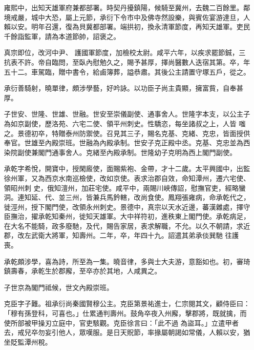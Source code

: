 \begin{pinyinscope}
 雍熙中，出知天雄軍府兼都部署。時契丹擾鎮陽，候騎至冀州，去魏二百餘里。鄰境戒嚴，城中大恐，屬上元節，承衍下令市中及佛寺然設樂，與賓佐宴游達旦，人賴以安。明年召還，復為貝冀都部署。端拱初，換永清軍節度，再知天雄軍。吏民千餘詣監軍，請為本道節帥，詔褒之。



 真宗即位，改河中尹、
 護國軍節度，加檢校太尉。咸平六年，以疾求罷節鋮，三抗表不許。帝自臨問，至臥內慰勉久之，賜予甚厚，擇尚醫數人迭宿其第。卒，年五十二。車駕臨，贈中書令，給鹵簿葬，謚恭肅。其後公主請置守塚五戶，從之。



 承衍善騎射，曉單律，頗涉學藝，好吟詠。以功臣子尚主貴顯，擁富貲，自奉甚厚。



 子世安、世隆、世雄、世融。世安至崇儀副使、通事舍人。世隆字本支，以公主子為如京副使，歷洛苑、六宅二使、領平州刺史。性驕恣，每坐諸叔之上，人皆
 嗤之。景德初卒，特贈泰州防禦使。召見其三子，賜名克基、克緒、克忠，皆面授供奉官。世雄至內殿崇班。世融為內殿承制。世安子克正殿中丞。克基、克忠並為西染院副使兼閣門通事舍人。克緒至內殿承制。世隆幼子克明為西上閣門副使。



 承乾字希悅，開寶中，授閑廄使，面賜紫袍、金帶，才十二歲。太平興國中，出監徐州軍，又為西京水南巡檢使，改如京使。表求治郡自效，命知潭州，遷六宅使、領昭州刺
 史，俄知澶州，加莊宅使。咸平中，兩賜川峽傳詔，慰撫官吏，經略蠻洞。連知延、代、並三州，皆兼兵馬鈐轄，改尚食使。鳳翔張雍病，命承乾代之，徙涇州，授下閣門使，改領永州刺史。景德中，真宗以天水近邊，蕃漢雜處，擇守臣撫治，擢承乾知秦州，徙知天雄軍。大中祥符初，進秩東上閣門使。承乾病足，在大名不能騎，政多廢馳，及代，賜告家居，表求解職，不允。以久不朝請，求近郡，改左武衛大將軍，知壽州。二年，卒，年四十九。詔遣其弟承倓巽馳
 往護喪。



 承乾頗涉學，喜為詩，所至為一集。曉音律，多與士大夫游，意豁如也。初，審琦鎮壽春，承乾生於郡廨，至卒亦於其地，人咸異之。



 子世京為閣門祗候，世文內殿崇班。



 克臣字子難。祖承衍尚秦國賢穆公主。克臣第景祐進士，仁宗閱其文，顧侍臣曰：「穆有孫登科，可喜也。」仕累通判壽州。鼓角卒夜入州廨，擊郡將，既就擒，而使所部被甲操刃立庭中，官吏駭觀。克臣徐言曰：「此不過
 為盜耳。」立遣甲者去，戒兒卒勿妄引他人，眾嘆服。是日天貺節，率掾屬朝謁如常儀，人賴以安，猶坐貶監潭州稅。




\end{pinyinscope}
